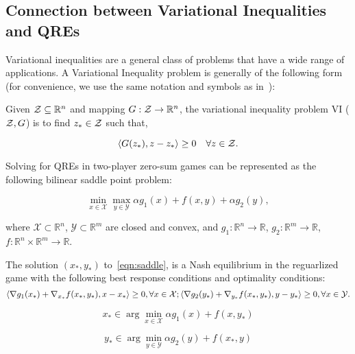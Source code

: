 \subsection{Connection between Variational Inequalities and QREs}

Variational inequalities are a general class of problems that have a wide range of applications.
A Variational Inequality problem is generally of the following form (for convenience, we use the
same notation and symbols as in~\cite{sokotaUnified2023}):

\begin{definition}
	Given $\mathcal{Z} \subseteq \mathbb{R}^n$ and mapping $G: \mathcal{Z} \rightarrow \mathbb{R}^n$, the variational inequality
	problem VI ($\mathcal{Z}, G$) is to find $z_{\ast} \in \mathcal{Z}$ such that,

	\[ \langle
		G(z_{\ast}), z - z_{\ast} \rangle \geq 0 \quad \forall z \in \mathcal{Z}.
	\]
\end{definition}


Solving for QREs in two-player zero-sum games can be represented as the following bilinear saddle
point problem:

\begin{equation}
	\label{eqn:saddle} \min_{x \in \mathcal{X}}
	\max_{y \in \mathcal{Y}} \alpha g_1(x) + f(x, y) + \alpha g_2(y),
\end{equation}

where $\mathcal{X} \subset \mathbb{R}^n$, $\mathcal{Y} \subset \mathbb{R}^m$
are closed and convex, and $g_1: \mathbb{R}^n \rightarrow \mathbb{R}$, $g_2: \mathbb{R}^m
	\rightarrow \mathbb{R}$, $f : \mathbb{R}^n \times \mathbb{R}^m \rightarrow \mathbb{R}$.

The solution $(x_{\ast}, y_{\ast})$ to~\ref{eqn:saddle}, is a Nash equilibrium in the reguarlized
game with the following best response conditions and optimality conditions: \begin{equation}
	\langle \nabla g_1(x_*) + \nabla_{x_*} f(x_*, y_*), x - x_* \rangle \geq 0, \forall x \in \mathcal{X} ;
	\langle \nabla g_2(y_*) + \nabla_{y_*} f(x_*, y_*), y - y_* \rangle \geq 0, \forall x \in \mathcal{Y}.
\end{equation}

\begin{equation}
	\label{eqn:bestrescon1} x_{\ast} \in \arg \min_{x \in \mathcal{X}} \alpha g_1(x) + f(x, y_{\ast})
\end{equation}

\begin{equation}
	\label{eqn:bestrescon2} y_{\ast} \in \arg
	\min_{y \in \mathcal{Y}} \alpha g_2(y) + f(x_{\ast}, y)
\end{equation}

